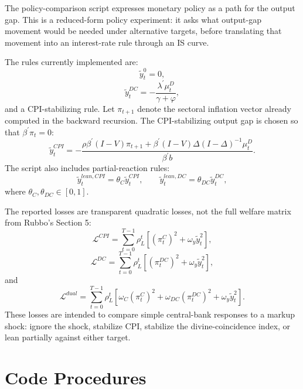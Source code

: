 \documentclass[11pt]{article}
\begin{document}
The policy-comparison script expresses monetary policy as a path for the output gap.
This is a reduced-form policy experiment: it asks what output-gap movement would be
needed under alternative targets, before translating that movement into an interest-rate
rule through an IS curve.

The rules currently implemented are:
\[
    \tilde y_t^{0}=0,
\]
\[
    \tilde y_t^{DC}
    =
    -\frac{\lambda^\prime \mu_t^D}{\gamma+\varphi},
\]
and a CPI-stabilizing rule. Let $\pi_{t+1}$ denote the sectoral inflation vector already
computed in the backward recursion. The CPI-stabilizing output gap is chosen so that
$\beta^\prime \pi_t=0$:
\[
    \tilde y_t^{CPI}
    =
    -
    \frac{
        \rho \beta^\prime (I-V)\pi_{t+1}
        +
        \beta^\prime (I-V)\Delta(I-\Delta)^{-1}\mu_t^D
    }{
        \beta^\prime b
    }.
\]
The script also includes partial-reaction rules:
\[
    \tilde y_t^{lean,CPI}
    =
    \theta_C \tilde y_t^{CPI},
    \qquad
    \tilde y_t^{lean,DC}
    =
    \theta_{DC} \tilde y_t^{DC},
\]
where $\theta_C,\theta_{DC}\in[0,1]$.

The reported losses are transparent quadratic losses, not the full welfare matrix from
Rubbo's Section 5:
\[
    \mathcal{L}^{CPI}
    =
    \sum_{t=0}^{T-1}
    \rho_L^t
    \left[
        (\pi_t^C)^2
        +
        \omega_y \tilde y_t^2
    \right],
\]
\[
    \mathcal{L}^{DC}
    =
    \sum_{t=0}^{T-1}
    \rho_L^t
    \left[
        (\pi_t^{DC})^2
        +
        \omega_y \tilde y_t^2
    \right],
\]
and
\[
    \mathcal{L}^{dual}
    =
    \sum_{t=0}^{T-1}
    \rho_L^t
    \left[
        \omega_C(\pi_t^C)^2
        +
        \omega_{DC}(\pi_t^{DC})^2
        +
        \omega_y \tilde y_t^2
    \right].
\]
These losses are intended to compare simple central-bank responses to a markup shock:
ignore the shock, stabilize CPI, stabilize the divine-coincidence index, or lean
partially against either target.

\section{Code Procedures}
\end{document}
